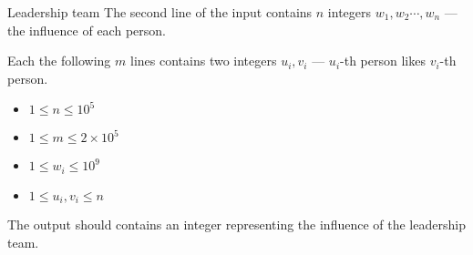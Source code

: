 \begin{problem}{Leadership team}
The second line of the input contains $n$ integers $w_1, w_2\cdots, w_n$ --- the influence of each person.

Each the following $m$ lines contains two integers $u_i, v_i$ --- $u_i$-th person likes $v_i$-th person.

\begin{itemize}
    \item $1 \leq n \leq 10^5$
    \item $1 \leq m \leq 2\times 10^5$
    \item $1 \leq w_i \leq 10^9$
    \item $1 \leq u_i, v_i \leq n$
  \end{itemize}

\OutputFile

The output should contains an integer representing the influence of the leadership team.

\Examples

\begin{example}
%
\end{example}

\end{problem}
